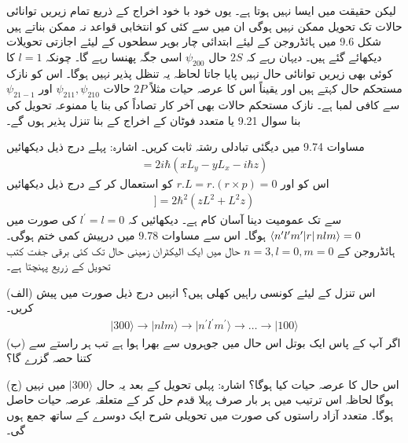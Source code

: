\documentclass[leqno, b5paper]{khalid-urdu-book}
\begin{document}
 لیکن حقیقت میں ایسا نہیں ہوتا ہے۔ یوں خود با خود اخراج کے ذریع تمام زیریں توانائی حالات تک تحویل ممکن نہیں ہوگی ان میں سے کئی کو انتخابی قواعد نہ ممکن بناتے ہیں شکل \num{9.6} میں ہائڈروجن کے لیئے ابتدائی چار بوہر سطحوں کے لیئے اجازتی تحویلات دیکھائے گئے ہیں۔ دیہان رہے کہ \(2S\) حال  \(\psi_{200}\) اسی جگہ پھنسا رہے گا۔ چونکہ \(l=1\) کا کوئی بھی زیریں توانائی حال نہیں پایا جاتا لحاظہ یہ تنظل پذیر نہیں ہوگا۔ اس کو نازک مستحکم حال کہتے ہیں اور یقیناً اس کا عرصہ حیات مثلاً \(2P\) حالات \(\psi_{211}, \psi_{210}\) اور \(\psi_{21-1}\) سے کافی لمبا ہے۔ نازک مستحکم حالات بھی آخر کار تصاداً کی بنا یا ممنوعہ تحویل کی بنا سوال \num{9.21} یا متعدد فوٹان  کے اخراج کے بنا تنزل پذیر ہوں گے۔
 
مساوات \num{9.74} میں دیگئی تبادلی رشتہ ثابت کریں۔ اشارہ: پہلے درج ذیل دیکھائیں
\begin{align*}
	[L^2, z] = 2i\hbar(xL_y-yL_x-i\hbar z)
\end{align*}
اس کو اور \(r.L = r.(r\times p) = 0\) کو استعمال کر کے درج ذیل دیکھائیں
\begin{align*}
[L^2, [L^2, z]] = 2\hbar^2(zL^2+L^2z)	
\end{align*}
 سے  تک عمومیت دینا آسان کام ہے۔
دیکھائیں کہ \(l^\prime = l = 0\) کی صورت میں \(\langle n^\prime l^\prime m^\prime \abs{r}nlm \rangle = 0\) ہوگا۔ اس سے مساوات \num{9.78} میں درپیش کمی ختم ہوگی۔
ہائڈروجن کے \(n = 3, l = 0, m = 0\) حال میں ایک الیکٹران زمینی حال تک کئی برقی جفت کتب تحویل کے زریع پہنچتا ہے۔

(الف) اس تنزل کے لیئے کونسی راہیں کھلی ہیں؟ انہیں درج ذیل صورت میں پیش کریں۔
\begin{align*}
	\mid300\rangle\rightarrow \mid nlm\rangle\rightarrow \mid n^\prime l^\prime m^\prime \rangle\rightarrow\dots\rightarrow\mid100\rangle
\end{align*}
(ب) اگر آپ کے پاس ایک بوتل اس حال میں جوہروں سے بھرا ہوا ہے تب ہر راستے سے کتنا حصہ گزرے گا؟

(ج) اس حال کا عرصہ حیات کیا ہوگا؟ اشارہ: پہلی تحویل کے بعد یہ حال \(\mid300\rangle\) میں نہیں ہوگا لحاظہ اس ترتیب میں ہر بار صرف پہلا قدم حل کر کے متعلقہ عرصہ حیات حاصل ہوگا۔ متعدد آزاد راستوں کی صورت میں تحویلی شرح ایک دوسرے کے ساتھ جمع ہوں گی۔
\end{document}
